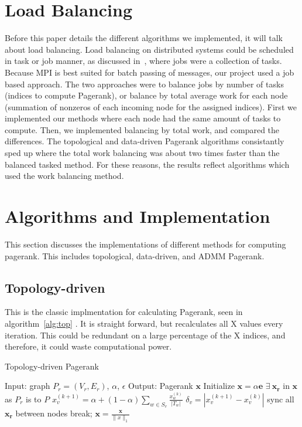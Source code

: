 \documentclass[letterpaper,11pt,onecolumn]{article}
\begin{document}
\section{Load Balancing}
Before this paper details the different algorithms we implemented, it will talk about load balancing. Load balancing on distributed systems could be scheduled in task or job manner, as discussed in~\cite{distributed}, where jobs were a collection of tasks. Because MPI is best suited for batch passing of messages, our project used a job based approach. The two approaches were to balance jobs by number of tasks (indices to compute Pagerank), or balance by total average work for each node (summation of nonzeros of each incoming node for the assigned indices). First we implemented our methods where each node had the same amount of tasks to compute. Then, we implemented balancing by total work, and compared the differences. The topological and data-driven Pagerank algorithms consistantly sped up where the total work balancing was about two times faster than the balanced tasked method. For these reasons, the results reflect algorithms which used the work balancing method. 

\section{Algorithms and Implementation}

This section discusses the implementations of different methods for computing pagerank. This includes topological, data-driven, and ADMM Pagerank. 

\subsection{Topology-driven}
This is the classic implmentation for calculating Pagerank, seen in algorithm~\ref{alg:top} . It is straight forward, but recalculates all X values every iteration. This could be redundant on a large percentage of the X indices, and therefore, it could waste computational power. 

\begin{algorithm}
\caption{Topology-driven Pagerank}
\label{alg:top}
\begin{algorithmic}[1]
  \STATE Input: graph $P_{r} = (V_r, E_r)$, $\alpha$, $\epsilon$
  \STATE Output: Pagerank $\mathbf{x}$
  \STATE Initialize $\mathbf{x} = \alpha \mathbf{e}$
  \STATE $\exists  \medspace \mathbf{x_r}$ in $\mathbf{x}$ as $P_r$ is to $P$
		\STATE $x_{v}^{(k+1)} = \alpha + (1 - \alpha) \sum_{w \in S_v} \frac{x_{w}^{(k)}}{|T_w|} $
		\STATE $\delta_{v} = | x_{v}^{(k+1)} - x_{v}^{(k)} | $
	\ENDFOR
	\STATE sync all $\mathbf{x_r}$ between nodes
	\IF{$\|\delta \|_{\infty} < \epsilon$}
		\STATE break;
	\ENDIF
  \ENDWHILE
  \STATE $\mathbf{x} = \frac{\mathbf{x} }{\|x\|_{1}}$
\end{algorithmic}
\end{algorithm}
\end{document}
